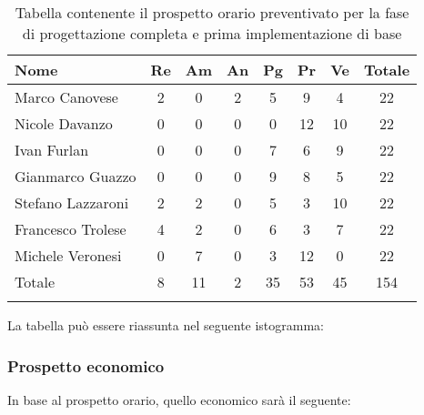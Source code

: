 			\begin{longtable}{|l|c|c|c|c|c|c|c|}
				\hline
				\rowcolor{lighter-grayer}
				\textbf{Nome} & \textbf{Re} & \textbf{Am} & \textbf{An} & \textbf{Pg}  & \textbf{Pr}   & \textbf{Ve} & \textbf{Totale} \\
				\hline
				\endfirsthead
				
				\hline
				Marco Canovese & 2 & 0 & 2 & 5 & 9 & 4 & 22\\
				\hline
				\hline
				Nicole Davanzo & 0 & 0 & 0 & 0 & 12 & 10 & 22\\
				\hline
				\hline
				Ivan Furlan & 0 & 0 & 0 & 7 & 6 & 9 & 22\\
				\hline
				\hline
				Gianmarco Guazzo & 0 & 0 & 0 & 9 & 8 & 5 & 22\\
				\hline
				\hline
				Stefano Lazzaroni & 2 & 2 & 0 & 5 & 3 & 10 & 22\\
				\hline
				\hline
				Francesco Trolese & 4 & 2 & 0 & 6 & 3 & 7 & 22\\
				\hline
				\hline
				Michele Veronesi & 0 & 7 & 0 & 3 & 12 & 0 & 22\\
				\hline 
				\hline
				Totale & 8 & 11 & 2 & 35 & 53 & 45 & 154\\
				\hline 
				\caption{Tabella contenente il prospetto orario preventivato per la fase di progettazione completa e prima implementazione di base}
			\end{longtable}

		
			La tabella può essere riassunta nel seguente istogramma:
		
		
			\subsubsection{Prospetto economico}
			In base al prospetto orario, quello economico sarà il seguente: 
			
